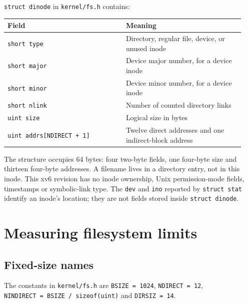 \documentclass{../latex/utmreport}
\begin{document}
\texttt{struct\ dinode} in \texttt{kernel/fs.h} contains:

{
\begin{longtable}[]{@{}
  >{\raggedright\arraybackslash}p{0.47\linewidth}
  >{\raggedright\arraybackslash}p{0.47\linewidth}@{}}
\hline
\begin{minipage}[b]{\linewidth}\raggedright
Field
\end{minipage} & \begin{minipage}[b]{\linewidth}\raggedright
Meaning
\end{minipage} \\
\hline
\endhead
\hline
\endlastfoot
\texttt{short\ type} & Directory, regular file, device, or unused
inode \\
\texttt{short\ major} & Device major number, for a device inode \\
\texttt{short\ minor} & Device minor number, for a device inode \\
\texttt{short\ nlink} & Number of counted directory links \\
\texttt{uint\ size} & Logical size in bytes \\
\texttt{uint\ addrs{[}NDIRECT\ +\ 1{]}} & Twelve direct addresses and
one indirect-block address \\
\end{longtable}
}

The structure occupies 64 bytes: four two-byte fields, one four-byte
size and thirteen four-byte addresses. A filename lives in a directory
entry, not in this inode. This xv6 revision has no inode ownership, Unix
permission-mode fields, timestamps or symbolic-link type. The
\texttt{dev} and \texttt{ino} reported by \texttt{struct\ stat} identify
an inode's location; they are not fields stored inside
\texttt{struct\ dinode}.

\chapter{Measuring filesystem limits}\label{measuring-filesystem-limits}

\section{Fixed-size names}\label{fixed-size-names}

The constants in \texttt{kernel/fs.h} are \texttt{BSIZE\ =\ 1024},
\texttt{NDIRECT\ =\ 12}, \texttt{NINDIRECT\ =\ BSIZE\ /\ sizeof(uint)}
and \texttt{DIRSIZ\ =\ 14}.
\end{document}
